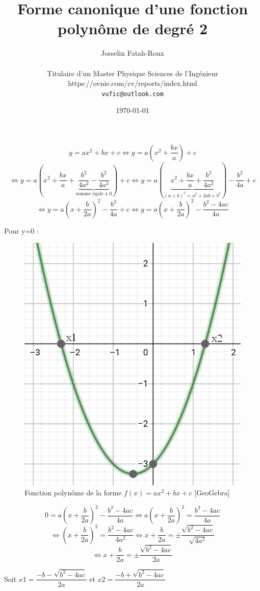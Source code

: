 \documentclass[a4paper,10pt]{article} %
\title{\textbf{Forme canonique d'une fonction polynôme de degré 2}} %
\author{Josselin Fatah-Roux\\\\
	Titulaire d'un Master Physique Sciences de l'Ingénieur\\
	https://ovnie.com/cv/reports/index.html\\
	\texttt{vufic@outlook.com}} %
\date{\today} %
\begin{document}
	\maketitle{} %
	$$y=ax^{2}+bx+c \Leftrightarrow y=a(x^{2}+\dfrac{bx}{a})+c$$
	$$\Leftrightarrow y=a(x^{2}+\dfrac{bx}{a}+\underbrace{\dfrac{b^{2}}{4a^{2}}-\dfrac{b^{2}}{4a^{2}}}_\textrm{somme égale à 0})+c \Leftrightarrow y=a(\underbrace{x^{2}+\dfrac{bx}{a}+\dfrac{b^{2}}{4a^{2}}}_{(a+b)^{2}=a^{2}+2ab+b^{2}})-\dfrac{b^{2}}{4a}+c$$
	$$\Leftrightarrow y=a(x+\dfrac{b}{2a})^{2}-\dfrac{b^{2}}{4a}+c \Leftrightarrow y=a(x+\dfrac{b}{2a})^{2}-\dfrac{b^{2}-4ac}{4a}$$
	\newline
	
	Pour y=0 :
	\newline
	
	\begin{figure}[h]
		\centering
		\includegraphics[scale=0.5]{2degre.png}
		\caption{Fonction polynôme de la forme $f(x)=ax^{2}+bx+c$ [GeoGebra]}
	\end{figure}
	
	$$ 0=a(x+\dfrac{b}{2a})^{2}-\dfrac{b^{2}-4ac}{4a} \Leftrightarrow a(x+\dfrac{b}{2a})^{2}=\dfrac{b^{2}-4ac}{4a}$$
	$$\Leftrightarrow (x+\dfrac{b}{2a})^{2}=\dfrac{b^{2}-4ac}{4a^{2}} \Leftrightarrow x+\dfrac{b}{2a}=\pm\dfrac{\sqrt{b^{2}-4ac}}{\sqrt{4a^{2}}}$$
	$$\Leftrightarrow x+\dfrac{b}{2a}=\pm\dfrac{\sqrt{b^{2}-4ac}}{2a}$$
	\begin{center}
		Soit $\boxed{x1=\dfrac{-b-\sqrt{b^{2}-4ac}}{2a}}$ et $\boxed{x2=\dfrac{-b+\sqrt{b^{2}-4ac}}{2a}}$
	\end{center}
\end{document}
